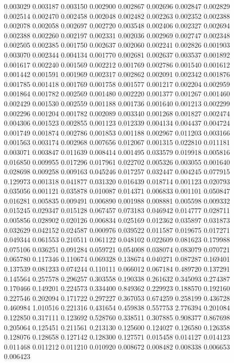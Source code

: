 0.003029
0.003187
0.003150
0.002900
0.002867
0.002696
0.002847
0.002829
0.002514
0.002470
0.002458
0.002048
0.002482
0.002263
0.002352
0.002388
0.002078
0.002058
0.002697
0.002720
0.003548
0.002406
0.002327
0.002694
0.002388
0.002260
0.002197
0.002331
0.002036
0.002969
0.002747
0.002348
0.002505
0.002385
0.001750
0.002637
0.002060
0.002241
0.002826
0.001903
0.003070
0.002344
0.004134
0.001770
0.002681
0.002637
0.003537
0.001892
0.001617
0.002240
0.001569
0.002212
0.001769
0.002786
0.001540
0.001612
0.001442
0.001591
0.001969
0.002317
0.002862
0.002091
0.002342
0.001876
0.001785
0.001418
0.001769
0.001758
0.001577
0.001217
0.002204
0.002959
0.001864
0.001782
0.002569
0.001480
0.002220
0.001377
0.001267
0.001460
0.002429
0.001530
0.002559
0.001188
0.001736
0.001640
0.001213
0.002299
0.002296
0.001204
0.001782
0.002089
0.003340
0.001268
0.001827
0.002474
0.004306
0.001523
0.002855
0.001123
0.012339
0.004134
0.004437
0.004724
0.001749
0.001874
0.002786
0.001853
0.001188
0.002967
0.011203
0.003166
0.001563
0.003174
0.002968
0.007656
0.012067
0.001315
0.022810
0.011181
0.003071
0.003847
0.011639
0.008414
0.001495
0.033579
0.019918
0.005816
0.016850
0.009955
0.017296
0.017961
0.022702
0.005326
0.003055
0.001640
0.028698
0.009258
0.009163
0.045246
0.017257
0.032447
0.004245
0.077915
0.129973
0.001318
0.041877
0.031320
0.016439
0.018714
0.001123
0.020793
0.035056
0.001121
0.035878
0.010087
0.014371
0.006833
0.001101
0.050847
0.016281
0.005835
0.009491
0.006890
0.001988
0.008881
0.005598
0.009332
0.015245
0.029347
0.015128
0.067457
0.073183
0.046942
0.014777
0.028711
0.005856
0.028902
0.020126
0.006834
0.025169
0.012362
0.035897
0.031873
0.032629
0.042152
0.024587
0.000976
0.039522
0.011587
0.019675
0.017271
0.049344
0.061553
0.210511
0.061122
0.048102
0.022609
0.081623
0.179988
0.075106
0.036251
0.091284
0.059721
0.054008
0.038074
0.083079
0.070721
0.065780
0.117346
0.110674
0.069328
0.138674
0.040271
0.087287
0.169401
0.137539
0.081233
0.074244
0.110111
0.066012
0.067184
0.489720
0.137291
0.145564
0.257578
0.296257
0.303558
0.190338
0.261632
0.345093
0.274387
0.170466
0.149201
0.224573
0.334400
0.849362
0.229923
0.188570
0.192160
0.227546
0.202094
0.171722
0.297227
0.367053
0.674259
0.258199
0.436728
0.460984
1.010516
0.221316
0.431654
0.459838
0.557753
2.776394
0.201084
0.122850
0.317111
0.123692
0.528760
0.338511
0.307885
0.908377
0.867698
0.205064
0.125451
0.211561
0.213130
0.125600
0.124027
0.126580
0.126358
0.128076
0.128658
0.127142
0.128300
0.127571
0.015458
0.014127
0.014123
0.011468
0.011212
0.011210
0.010920
0.008672
0.008482
0.008338
0.006653
0.006423

